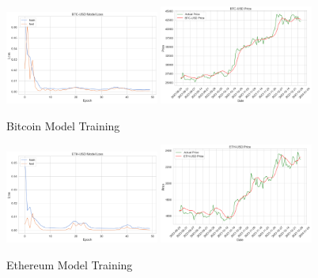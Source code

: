 \documentclass{ledger}
\begin{document}
\begin{figure}[htbp]
    \centering
    \includegraphics[width=0.45\textwidth]{code/price-prediction/lstm/images/btc_usd_loss.png} %
    \hspace{0.05\textwidth} %
    \includegraphics[width=0.45\textwidth]{code/price-prediction/lstm/images/btc_usd_price.png} %
    \caption{Bitcoin Model Training}
    \label{fig:side_by_side}
\end{figure}

\begin{figure}[htbp]
    \centering
    \includegraphics[width=0.45\textwidth]{code/price-prediction/lstm/images/eth_usd_loss.png} %
    \hspace{0.05\textwidth} %
    \includegraphics[width=0.45\textwidth]{code/price-prediction/lstm/images/eth_usd_model.png} %
    \caption{Ethereum Model Training}
    \label{fig:side_by_side}
\end{figure}
\end{document}
